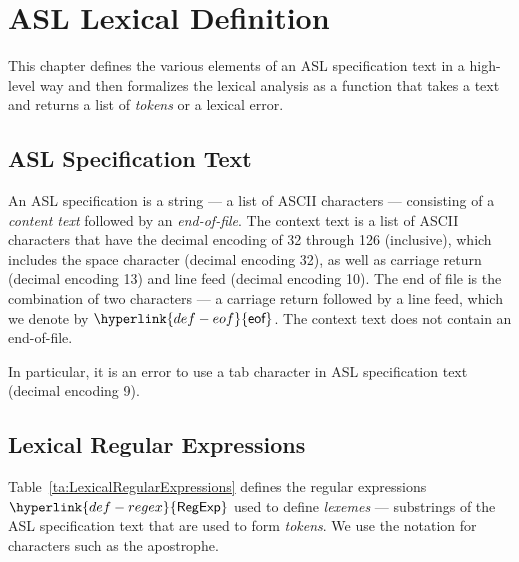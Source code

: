 \documentclass{book}
\newcommand\eof[0]{\hyperlink{def-eof}{\textsf{eof}}}
\newcommand\Char[1]{\fbox{#1}}
\newcommand\RegExp[0]{\hyperlink{def-regex}{\textsf{RegExp}}}
\begin{document}
\chapter{ASL Lexical Definition \label{chap:lexicalanalysis}}
This chapter defines the various elements of an ASL specification text in a high-level way
and then formalizes the lexical analysis as a function that takes a text and returns
a list of \emph{tokens} or a lexical error.

\section{ASL Specification Text}
An ASL specification is a string --- a list of ASCII characters --- consisting of a \emph{content text} followed by an \emph{end-of-file}.
The context text is a list of
ASCII characters that have the decimal encoding of 32 through 126 (inclusive),
which includes the space character (decimal encoding 32),
as well as
carriage return (decimal encoding 13) and line feed (decimal encoding 10).
\hypertarget{def-eof}{}
The end of file is the combination of two characters --- a carriage return followed by a line feed,
which we denote by $\eof$.
The context text does not contain an end-of-file.

In particular, it is an error to use a tab character in ASL specification text (decimal encoding 9).

\section{Lexical Regular Expressions}

\hypertarget{def-regex}{}
Table~\ref{ta:LexicalRegularExpressions} defines the regular expressions $\RegExp$ used to define
\emph{lexemes} --- substrings of the ASL specification text that are used to form \emph{tokens}.
We use the notation \Char{c} for characters such as the apostrophe.
\end{document}
